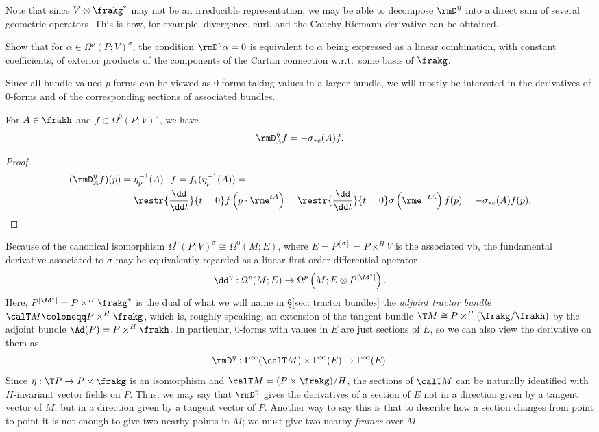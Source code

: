 Note that since $V\otimes\frakg^\ast$ may not be an irreducible representation, we may be able to decompose $\rmD^\eta$ into a direct sum of several geometric operators. This is how, for example, divergence, curl, and the Cauchy-Riemann derivative can be obtained.

\begin{xca}
    Show that for $\alpha\in\Omega^p(P;V)^\sigma$, the condition $\rmD^\eta\alpha=0$ is equivalent to $\alpha$ being expressed as a linear combination, with constant coefficients, of exterior products of the components of the Cartan connection w.r.t.\ some basis of $\frakg$.
\end{xca}

Since all bundle-valued $p$-forms can be viewed as $0$-forms taking values in a larger bundle, we will mostly be interested in the derivatives of $0$-forms and of the corresponding sections of associated bundles.

\begin{lem}
For $A\in\frakh$ and $f\in \Omega^0(P;V)^\sigma$, we have 
\[\rmD^\eta_Af=-\sigma_{\ast e}(A)f.\]
\end{lem}
\begin{proof}
    \begin{align}
        (\rmD^\eta_Af)(p)&=\eta^{-1}_p(A)\cdot f =f_\ast(\eta^{-1}_p(A))=\\
        &=\restr{\frac{\dd}{\dd t}}{t=0}f\left(p\cdot \rme^{tA}\right)=\restr{\frac{\dd}{\dd t}}{t=0}\sigma\left(\rme^{-tA}\right)f(p)=-\sigma_{\ast e}(A)f(p).
    \end{align}
\end{proof}

Because of the canonical isomorphism $\Omega^0(P;V)^\sigma\cong \Omega^0(M;E)$, where $E=P^{[\sigma]}=P\times^H V$ is the associated \gls{vb}, the fundamental derivative associated to $\sigma$ may be equivalently regarded as a linear first-order differential operator 
\[\dd^\eta:\Omega^p(M;E)\to \Omega^p\left(M;E\otimes P^{[\Ad^\ast]}\right).\]
Here, $P^{[\Ad^\ast]}=P\times^H\frakg^\ast$ is the dual of what we will name in \S\ref{sec: tractor bundles} the \emph{adjoint tractor bundle} $\calT M\coloneqq P\times^H\frakg$, which is, roughly speaking, an extension of the tangent bundle $\T M\cong P\times^H (\frakg\slash\frakh)$ by the adjoint bundle $\Ad(P)=P\times^H\frakh$. In particular, $0$-forms with values in $E$ are just sections of $E$, so we can also view the derivative on them as 
\[\rmD^\eta:\Gamma^\infty(\calT M)\times \Gamma^\infty(E)\to \Gamma^\infty(E).\]
Since $\eta:\T P\to P\times\frakg$ is an isomorphism and $\calT M= (P\times \frakg)\slash H$, the sections of $\calT M$ can be naturally identified with $H$-invariant vector fields on $P$. Thus, we may say that $\rmD^\eta$ gives the derivatives of a section of $E$ not in a direction given by a tangent vector of $M$, but in a direction given by a tangent vector of $P$. Another way to say this is that to describe how a section changes from point to point it is not enough to give two nearby points in $M$; we must give two nearby \emph{frames} over $M$.

